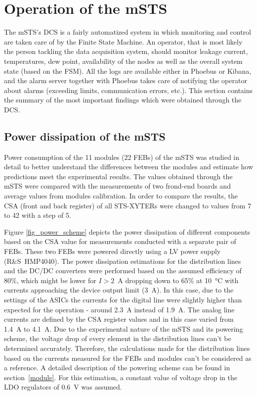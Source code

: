 \section{Operation of the mSTS}

The \gls{mSTS}'s \gls{DCS} is a fairly automatized system in which monitoring and control are taken care of by the Finite State Machine. An operator, that is most likely the person tackling the data acquisition system, should monitor leakage current, temperatures, dew point, availability of the nodes as well as the overall system state (based on the \gls{FSM}). All the logs are available either in Phoebus or Kibana, and the alarm server together with Phoebus takes care of notifying the operator about alarms (exceeding limits, communication errors, etc.). This section contains the summary of the most important findings which were obtained through the \gls{DCS}. 
\subsection{Power dissipation of the mSTS}
 Power consumption of the 11 modules (22 \glspl{FEB}) of the \gls{mSTS} was studied in detail to better understand the differences between the modules and estimate how predictions meet the experimental results. The values obtained through the \gls{mSTS} were compared with the measurements of two frond-end boards and average values from modules calibration. In order to compare the results, the \gls{CSA} (front and back register) of all STS-XYTERs were changed to values from 7 to 42 with a step of 5.
 
 Figure \ref{fig_power_scheme} depicts the power dissipation of different components based on the \gls{CSA} value for measurements conducted with a separate pair of \gls{FEB}s. These two \glspl{FEB} were powered directly using a \gls{LV} power supply (R\&S~HMP4040). The power dissipation estimations for the distribution lines and the DC/DC converters were performed based on the assumed efficiency of 80\%, which might be lower for $I > 2$~A dropping down to 65\% at \SI{10}{\celsius} with currents approaching the device output limit (3~A). In this case, due to the settings of the \glspl{ASIC} the currents for the digital line were slightly higher than expected for the operation - around 2.3~A instead of 1.9~A. The analog line currents are defined by the \gls{CSA} register values and in this case varied from 1.4~A to 4.1~A.  Due to the experimental nature of the \gls{mSTS} and its powering scheme, the voltage drop of every element in the distribution lines can't be determined accurately. Therefore, the calculations made for the distribution lines based on the currents measured for the \glspl{FEB} and modules can't be considered as a reference. A detailed description of the powering scheme can be found in section~\ref{module}.  For this estimation, a constant value of voltage drop in the \gls{LDO} regulators of 0.6~V was assumed. 

